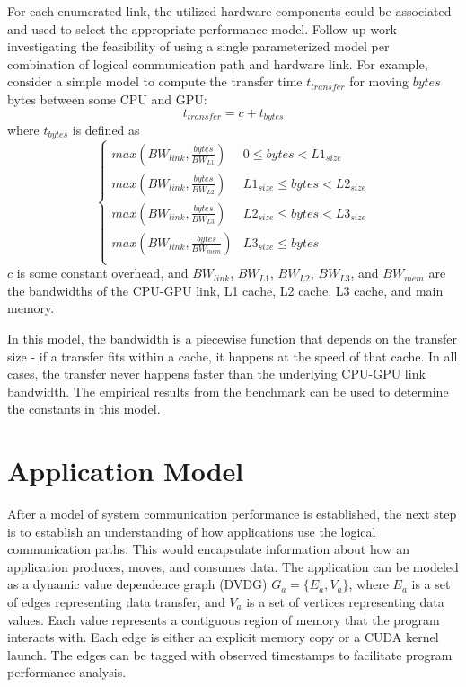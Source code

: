 For each enumerated link, the utilized hardware components could be associated and used to select the appropriate performance model.
Follow-up work investigating the feasibility of using a single parameterized model per combination of logical communication path and hardware link.
For example, consider a simple model to compute the transfer time $t_{transfer}$ for moving $bytes$ bytes between some CPU and GPU:
\[
    t_{transfer} = c + t_{bytes}
\]
where $t_{bytes}$ is defined as
\[ \begin{cases} 
    max(BW_{link}, \frac{bytes}{BW_{L1}}) & 0 \leq bytes < L1_{size} \\
    max(BW_{link}, \frac{bytes}{BW_{L2}}) & L1_{size} \leq bytes < L2_{size} \\
    max(BW_{link}, \frac{bytes}{BW_{L3}}) & L2_{size} \leq bytes < L3_{size} \\
    max(BW_{link}, \frac{bytes}{BW_{mem}}) & L3_{size} \leq bytes  \\
 \end{cases}
\]
$c$ is some constant overhead, and $BW_{link}$, $BW_{L1}$, $BW_{L2}$, $BW_{L3}$, and $BW_{mem}$ are the bandwidths of the CPU-GPU link, L1 cache, L2 cache, L3 cache, and main memory.

In this model, the bandwidth is a piecewise function that depends on the transfer size - if a transfer fits within a cache, it happens at the speed of that cache.
In all cases, the transfer never happens faster than the underlying CPU-GPU link bandwidth.
The empirical results from the benchmark can be used to determine the constants in this model.

\section{Application Model}
\label{sec:app-model}

After a model of system communication performance is established, the next step is to establish an understanding of how applications use the logical communication paths.
This would encapsulate information about how an application produces, moves, and consumes data.
The application can be modeled as a dynamic value dependence graph (DVDG) $G_a = \{E_a,V_a\}$, where $E_a$ is a set of edges representing data transfer, and $V_a$ is a set of vertices representing data values.
Each value represents a contiguous region of memory that the program interacts with.
Each edge is either an explicit memory copy or a CUDA kernel launch.
The edges can be tagged with observed timestamps to facilitate program performance analysis.

